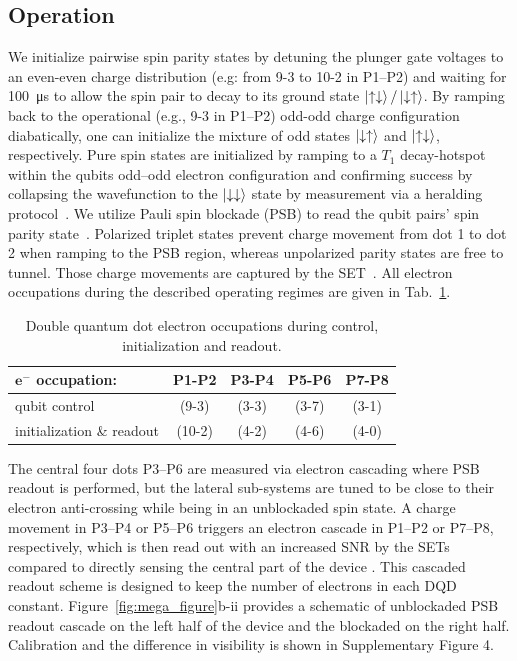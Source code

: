 \documentclass[superscriptaddress,twocolumn,10pt,prl,floatfix,nofootinbib,aps]{revtex4-2}
\begin{document}
\subsection{Operation}
\noindent
We initialize pairwise spin parity states by detuning the plunger gate voltages to an even-even charge distribution (e.g: from 9-3 to 10-2 in P1--P2) and waiting for \SI{100}{\micro \second} to allow the spin pair to decay to its ground state $\ket{\uparrow\downarrow}/ \ket{\downarrow\uparrow}$. By ramping back to the operational (e.g., 9-3 in P1--P2) odd-odd charge configuration diabatically, one can initialize the mixture of odd states $\ket{\downarrow\uparrow}$ and $ \ket{\uparrow\downarrow}$, respectively.
Pure spin states are initialized by ramping to a $T_1$ decay-hotspot within the qubits odd--odd electron configuration and confirming success by collapsing the wavefunction to the $\ket{\downarrow\downarrow}$ state by measurement via a heralding protocol~\cite{yang_operation_2020, huang_high-fidelity_2024}.
We utilize Pauli spin blockade (PSB) to read the qubit pairs' spin parity state~\cite{johnson_singlet-triplet_2005, seedhouse_pauli_2021}.
Polarized triplet states prevent charge movement from dot 1 to dot 2 when ramping to the PSB region, whereas unpolarized parity states are free to tunnel. Those charge movements are captured by the SET~\cite{seedhouse_pauli_2021}. All electron occupations during the described operating regimes are given in Tab.~\ref{tab:e_occupations}.

\begin{table}
\centering
    \begin{tabular}{|l|c|c|c|c|}
    \hline
    \textbf{$\mathbf{e^-}$ occupation:} & \textbf{P1-P2} & \textbf{P3-P4} & \textbf{P5-P6} & \textbf{P7-P8} \\
    \hline
    
    qubit control        & (9-3) & (3-3) & (3-7) & (3-1) \\
    initialization \& readout & (10-2) & (4-2) & (4-6) & (4-0) \\
    \hline
    \end{tabular}
\caption{
    Double quantum dot electron occupations during control, initialization and readout. \label{tab:e_occupations}
}
\end{table}
The central four dots P3--P6 are measured via electron cascading where PSB readout is performed, but the lateral sub-systems are tuned to be close to their electron anti-crossing while being in an unblockaded spin state. A charge movement in P3--P4 or P5--P6 triggers an electron cascade in P1--P2 or P7--P8, respectively,  which is then read out with an increased SNR by the SETs compared to directly sensing the central part of the device \cite{van_diepen_electron_2021}.  This cascaded readout scheme is designed to keep the number of electrons in each DQD constant. Figure~\ref{fig:mega_figure}b-ii provides a schematic of unblockaded PSB readout cascade on the left half of the device and the blockaded on the right half. Calibration and the difference in visibility is shown in Supplementary Figure 4.
\end{document}
